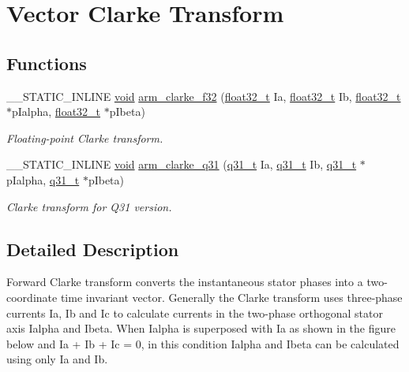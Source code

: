 \hypertarget{group__clarke}{\section{Vector Clarke Transform}
\label{group__clarke}
}
\subsection*{Functions}
\begin{DoxyCompactItemize}
\item 
\-\_\-\-\_\-\-S\-T\-A\-T\-I\-C\-\_\-\-I\-N\-L\-I\-N\-E \hyperlink{group___n_a_m_e_ga18028b8badbf1ea7e704ccac3c488e82}{void} \hyperlink{group__clarke_ga011c5e6820d26514d28bc3cbb9d3ab15}{arm\-\_\-clarke\-\_\-f32} (\hyperlink{arm__math_8h_a4611b605e45ab401f02cab15c5e38715}{float32\-\_\-t} Ia, \hyperlink{arm__math_8h_a4611b605e45ab401f02cab15c5e38715}{float32\-\_\-t} Ib, \hyperlink{arm__math_8h_a4611b605e45ab401f02cab15c5e38715}{float32\-\_\-t} $\ast$p\-Ialpha, \hyperlink{arm__math_8h_a4611b605e45ab401f02cab15c5e38715}{float32\-\_\-t} $\ast$p\-Ibeta)
\begin{DoxyCompactList}\small\item\em Floating-\/point Clarke transform. \end{DoxyCompactList}\item 
\-\_\-\-\_\-\-S\-T\-A\-T\-I\-C\-\_\-\-I\-N\-L\-I\-N\-E \hyperlink{group___n_a_m_e_ga18028b8badbf1ea7e704ccac3c488e82}{void} \hyperlink{group__clarke_gae2f77fac21539c21a01dedc5c42b3863}{arm\-\_\-clarke\-\_\-q31} (\hyperlink{arm__math_8h_adc89a3547f5324b7b3b95adec3806bc0}{q31\-\_\-t} Ia, \hyperlink{arm__math_8h_adc89a3547f5324b7b3b95adec3806bc0}{q31\-\_\-t} Ib, \hyperlink{arm__math_8h_adc89a3547f5324b7b3b95adec3806bc0}{q31\-\_\-t} $\ast$p\-Ialpha, \hyperlink{arm__math_8h_adc89a3547f5324b7b3b95adec3806bc0}{q31\-\_\-t} $\ast$p\-Ibeta)
\begin{DoxyCompactList}\small\item\em Clarke transform for Q31 version. \end{DoxyCompactList}\end{DoxyCompactItemize}


\subsection{Detailed Description}
Forward Clarke transform converts the instantaneous stator phases into a two-\/coordinate time invariant vector. Generally the Clarke transform uses three-\/phase currents {\ttfamily Ia, Ib and Ic} to calculate currents in the two-\/phase orthogonal stator axis {\ttfamily Ialpha} and {\ttfamily Ibeta}. When {\ttfamily Ialpha} is superposed with {\ttfamily Ia} as shown in the figure below  and {\ttfamily Ia + Ib + Ic = 0}, in this condition {\ttfamily Ialpha} and {\ttfamily Ibeta} can be calculated using only {\ttfamily Ia} and {\ttfamily Ib}.

